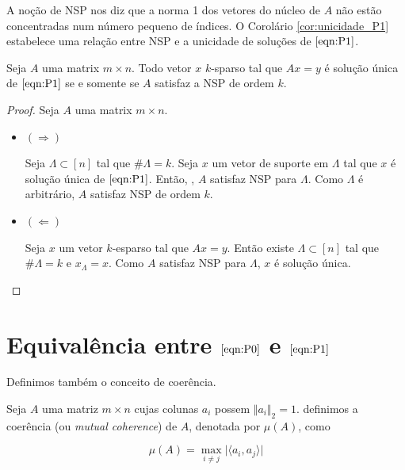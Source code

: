 A noção de NSP nos diz que a norma 1 dos vetores do núcleo de $A$ não estão concentradas num número pequeno de índices. O Corolário \ref{cor:unicidade_P1} estabelece uma relação entre NSP e a unicidade de soluções de $\eqref{eqn:P1}$.

\begin{corolario}
\label{cor:unicidade_P1}
Seja $A$ uma matrix $m \times n$. Todo vetor $x$ $k$-sparso tal que $Ax = y$ é solução única de $\eqref{eqn:P1}$ se e somente se $A$ satisfaz a NSP de ordem $k$.
\end{corolario}
\begin{proof}
Seja $A$ uma matrix $m \times n$.
\begin{itemize}

\item $( \Rightarrow )$

Seja $\Lambda \subset [n]$ tal que $\# \Lambda = k$. Seja $x$ um vetor de suporte em $\Lambda$ tal que $x$ é solução única de $\eqref{eqn:P1}$. Então, , $A$ satisfaz NSP para $\Lambda$. Como $\Lambda$ é arbitrário, $A$ satisfaz NSP de ordem $k$.

\item $( \Leftarrow )$

Seja $x$ um vetor $k$-esparso tal que $Ax = y$. Então existe $\Lambda \subset [n]$ tal que $\# \Lambda = k$ e $x_{\Lambda} = x$. Como $A$ satisfaz NSP para $\Lambda$, $x$ é solução única.
\end{itemize}
\end{proof}

\section{Equivalência entre $\eqref{eqn:P0}$ e $\eqref{eqn:P1}$}
 Definimos também o conceito de coerência.

\begin{definicao}
Seja $A$ uma matriz $m \times n$ cujas colunas $a_i$ possem $\Vert a_i \Vert_2 = 1$. definimos a coerência (ou \textit{mutual coherence}) de $A$, denotada por $\mu(A)$, como


$$\mu(A) = \max_{i \neq j} \vert \langle a_i, a_j \rangle \vert$$
\end{definicao}

